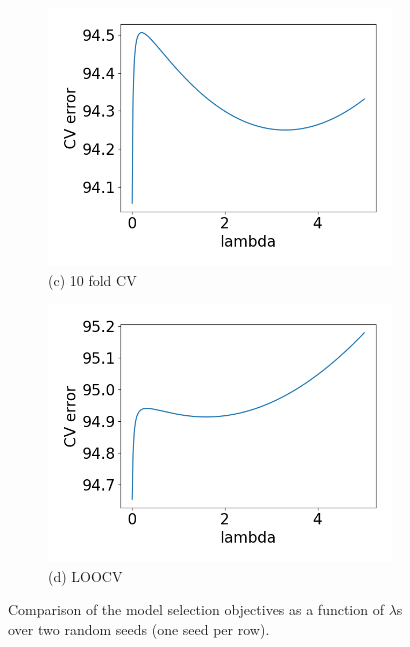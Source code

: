 \begin{figure}[t!]
\begin{subfigure}[b]{.24\columnwidth}
    \includegraphics[width=\columnwidth]{../fig/collinear_10fold_obj_82.png}
    \caption{(c) 10 fold CV}
\end{subfigure}
\hfill
\centering
\begin{subfigure}[b]{.24\columnwidth} 
    \includegraphics[width=\columnwidth]{../fig/collinear_loocv_obj_82.png}
    \caption{(d) LOOCV}
\end{subfigure}
\caption{Comparison of the model selection objectives as a function of $\lambda$s over two random seeds (one seed per row).}
\label{fig:convexity}
\end{figure}

